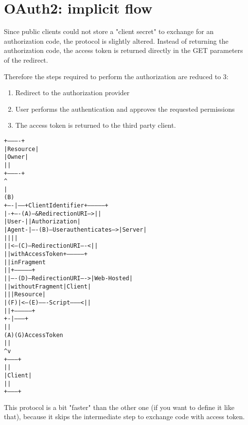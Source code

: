 \section{OAuth2: implicit flow}
\label{sec:implicit}
Since public clients could not store a "client secret" to exchange for an
authorization code, the protocol is slightly altered.
Instead of returning the authorization code, the access token is returned
directly in the GET parameters of the redirect.

Therefore the steps required to perform the authorization are reduced to 3:
\begin{enumerate}
    \item Redirect to the authorization provider
    \item User performs the authentication and approves the requested
        permissions
    \item The access token is returned to the third party client.
\end{enumerate}

\begin{alltt}
     +----------+
     | Resource |
     |  Owner   |
     |          |
     +----------+
          ^
          |
         (B)
     +----|-----+          Client Identifier     +---------------+
     |         -+----(A)-- & Redirection URI --->|               |
     |  User-   |                                | Authorization |
     |  Agent  -|----(B)-- User authenticates -->|     Server    |
     |          |                                |               |
     |          |<---(C)--- Redirection URI ----<|               |
     |          |          with Access Token     +---------------+
     |          |            in Fragment
     |          |                                +---------------+
     |          |----(D)--- Redirection URI ---->|   Web-Hosted  |
     |          |          without Fragment      |     Client    |
     |          |                                |    Resource   |
     |     (F)  |<---(E)------- Script ---------<|               |
     |          |                                +---------------+
     +-|--------+
       |    |
      (A)  (G) Access Token
       |    |
       ^    v
     +---------+
     |         |
     |  Client |
     |         |
     +---------+
\end{alltt}


This protocol is a bit "faster" than the other one (if you want to define it
like that), because it skips the intermediate step to exchange code with access
token.

